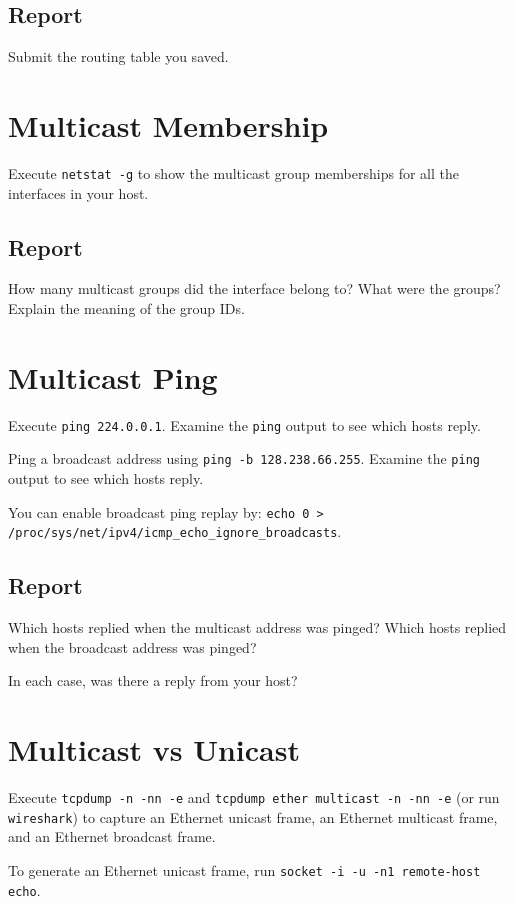 \documentclass{../UTNetLab}
\begin{document}
    \subsection*{Report}
    Submit the routing table you saved.

\section{Multicast Membership}
    Execute \lstinline{netstat -g} to show the multicast group memberships for all the interfaces in your host.
    
    \subsection*{Report}
    How many multicast groups did the interface belong to? What were the groups? Explain the meaning of the group IDs.

\section{Multicast Ping}
    Execute \lstinline{ping 224.0.0.1}.
    Examine the \lstinline{ping} output to see which hosts reply.

    Ping a broadcast address using \lstinline{ping -b 128.238.66.255}.
    Examine the \lstinline{ping} output to see which hosts reply.

    You can enable broadcast ping replay by: \lstinline{echo 0 > /proc/sys/net/ipv4/icmp_echo_ignore_broadcasts}.
    
    \subsection*{Report}
    Which hosts replied when the multicast address was pinged?
    Which hosts replied when the broadcast address was pinged?

    In each case, was there a reply from your host?

\section{Multicast vs Unicast}
    Execute \lstinline{tcpdump -n -nn -e} and \lstinline{tcpdump ether multicast -n -nn -e} (or run \lstinline{wireshark}) to capture an Ethernet unicast frame, an Ethernet multicast frame, and an Ethernet broadcast frame.

    To generate an Ethernet unicast frame, run \lstinline[emph={your-host, remote-host}]{socket -i -u -n1 remote-host echo}.
\end{document}
